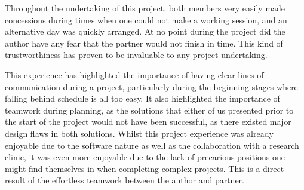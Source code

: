 \documentclass[conference, onecolumn]{IEEEtran}
\begin{document}
Throughout the undertaking of this project, both members very easily made concessions during times when one could not make a working session, and an alternative day was quickly arranged.
At no point during the project did the author have any fear that the partner would not finish in time.
This kind of trustworthiness has proven to be invaluable to any project undertaking.

This experience has highlighted the importance of having clear lines of communication during a project, particularly during the beginning stages where falling behind schedule is all too easy.
It also highlighted the importance of teamwork during planning, as the solutions that either of us presented prior to the start of the project would not have been successful, as there existed major design flaws in both solutions.
Whilst this project experience was already enjoyable due to the software nature as well as the collaboration with a research clinic, it was even more enjoyable due to the lack of precarious positions one might find themselves in when completing complex projects.
This is a direct result of the effortless teamwork between the author and partner.
\end{document}
